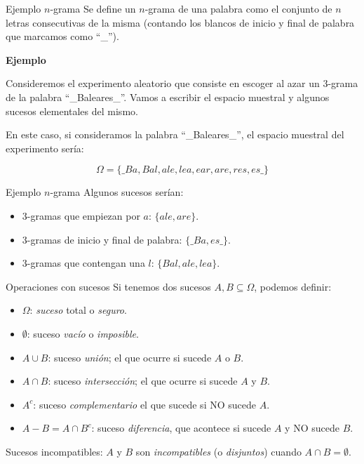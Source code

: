 \documentclass[
  ignorenonframetext,
  aspectratio=169]{beamer}
\providecommand{\tightlist}{%
  \setlength{\itemsep}{0pt}\setlength{\parskip}{0pt}}\usepackage{longtable,booktabs,array}
\begin{document}
\begin{frame}{Ejemplo \(n\)-grama}
\label{ejemplo-n-grama}
Se define un \(n\)-grama de una palabra como el conjunto de \(n\) letras
consecutivas de la misma (contando los blancos de inicio y final de
palabra que marcamos como ``\_'').

\textbf{Ejemplo}

Consideremos el experimento aleatorio que consiste en escoger al azar un
3-grama de la palabra ``\_Baleares\_''. Vamos a escribir el espacio
muestral y algunos sucesos elementales del mismo.

En este caso, si consideramos la palabra ``\_Baleares\_'', el espacio
muestral del experimento sería:

\[\Omega=\{\_Ba, Bal, ale, lea, ear, are, res, es\_\}\]
\end{frame}

\begin{frame}{Ejemplo \(n\)-grama}
\label{ejemplo-n-grama-1}
Algunos sucesos serían:

\begin{itemize}
\tightlist
\item
  3-gramas que empiezan por \(a\): \(\{ale,are\}.\)
\item
  3-gramas de inicio y final de palabra: \(\{\_Ba,es\_\}.\)
\item
  3-gramas que contengan una \(l\): \(\{Bal,ale,lea\}.\)
\end{itemize}
\end{frame}

\begin{frame}{Operaciones con sucesos}
\label{operaciones-con-sucesos}
Si tenemos dos sucesos \(A,B\subseteq \Omega\), podemos definir:

\begin{itemize}
\tightlist
\item
  \(\Omega\): \emph{suceso} total o \emph{seguro}.
\item
  \(\emptyset\): suceso \emph{vacío} o \emph{imposible}.
\item
  \(A\cup B\): suceso \emph{unión}; el que ocurre si sucede \(A\) o
  \(B\).
\item
  \(A\cap B\): suceso \emph{intersección}; el que ocurre si sucede \(A\)
  y \(B\).
\item
  \(A^c\): suceso \emph{complementario} el que sucede si NO sucede
  \(A\).
\item
  \(A- B=A\cap B^c\): suceso \emph{diferencia}, que acontece si sucede
  \(A\) y NO sucede \(B\).
\end{itemize}

Sucesos incompatibles: \(A\) y \(B\) son \emph{incompatibles} (o
\emph{disjuntos}) cuando \(A\cap B=\emptyset\).
\end{frame}
\end{document}
